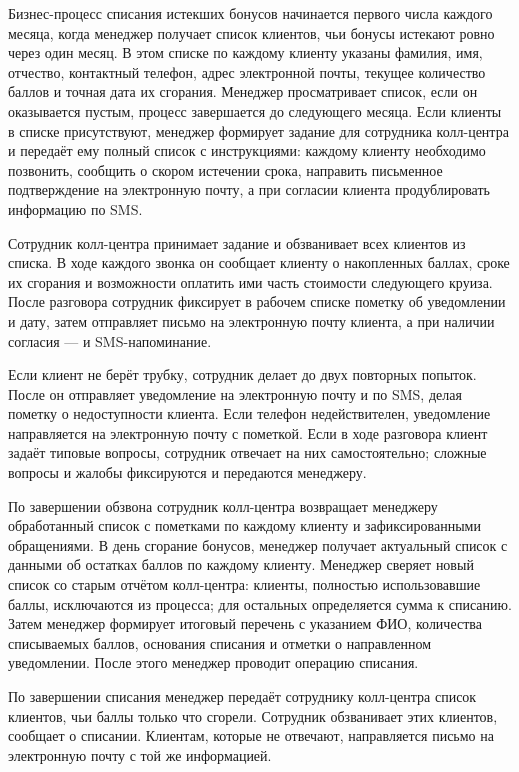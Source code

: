 \documentclass[11pt,a4paper,final]{article}
\begin{document}
Бизнес-процесс списания истекших бонусов начинается первого числа каждого
месяца, когда менеджер получает список
клиентов, чьи бонусы истекают ровно через один месяц. В этом списке по каждому
клиенту указаны фамилия, имя, отчество, контактный телефон, адрес электронной
почты, текущее количество баллов и точная дата их сгорания. Менеджер
просматривает список, если он оказывается пустым, процесс завершается до
следующего месяца. Если клиенты в списке присутствуют, менеджер формирует
задание для сотрудника колл-центра и передаёт ему полный список с инструкциями:
каждому клиенту необходимо позвонить, сообщить о скором истечении срока,
направить письменное подтверждение на электронную почту, а при согласии клиента
продублировать информацию по SMS.

Сотрудник колл-центра принимает задание и обзванивает всех
клиентов из списка. В ходе каждого звонка он сообщает клиенту о накопленных
баллах, сроке их сгорания и возможности оплатить ими часть стоимости следующего
круиза. После разговора сотрудник фиксирует в рабочем списке пометку об
уведомлении и дату, затем отправляет письмо на электронную почту
клиента, а при наличии согласия — и SMS-напоминание.

Если клиент не берёт трубку, сотрудник делает до двух повторных попыток. После он отправляет уведомление на электронную почту и по SMS, делая
пометку о недоступности клиента. Если телефон недействителен,
уведомление направляется на электронную почту с
пометкой. Если в ходе разговора клиент задаёт типовые вопросы, сотрудник отвечает на них
самостоятельно; сложные вопросы и жалобы
фиксируются и передаются менеджеру.

По завершении обзвона сотрудник колл-центра возвращает менеджеру обработанный
список с пометками по каждому клиенту и зафиксированными обращениями. В день сгорание бонусов, менеджер получает актуальный
список с данными об остатках баллов по каждому клиенту. Менеджер сверяет новый список со старым отчётом колл-центра:
клиенты, полностью использовавшие баллы, исключаются из процесса; для
остальных определяется сумма к списанию. Затем менеджер формирует итоговый
перечень с указанием ФИО, количества списываемых баллов, основания списания и
отметки о направленном уведомлении. После этого менеджер проводит операцию
списания.

По завершении списания менеджер передаёт сотруднику колл-центра список
клиентов, чьи баллы только что сгорели. Сотрудник обзванивает этих клиентов,
сообщает о списании. Клиентам, которые не отвечают, направляется письмо на электронную почту с
той же информацией.
\end{document}
